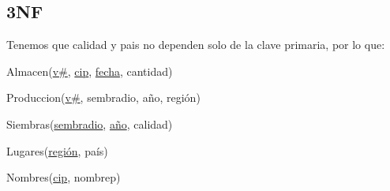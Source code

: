 \subsection*{3NF}
Tenemos que calidad y pais no dependen solo de la clave primaria, por lo que:

Almacen(\underline{v\#}, \underline{cip}, \underline{fecha}, cantidad)

Produccion(\underline{v\#}, sembradio, año, región)

Siembras(\underline{sembradio}, \underline{año}, calidad)

Lugares(\underline{región}, país)

Nombres(\underline{cip}, nombrep)

